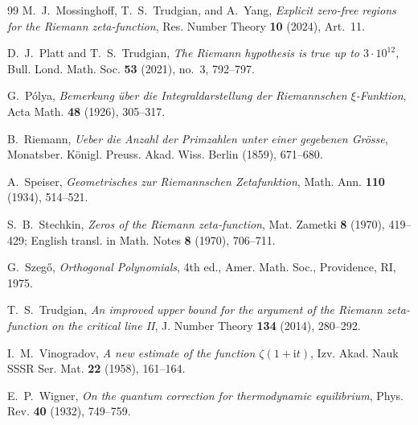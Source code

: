 \documentclass[11pt,reqno]{amsart}
\theoremstyle{definition}
\theoremstyle{remark}
\numberwithin{equation}{section}
\newcommand{\ii}{\mathrm{i}}
\begin{document}
\begin{thebibliography}{99}
M.~J.~Mossinghoff, T.~S.~Trudgian, and A.~Yang,
\emph{Explicit zero-free regions for the Riemann zeta-function},
Res. Number Theory \textbf{10} (2024), Art.~11.

D.~J.~Platt and T.~S.~Trudgian,
\emph{The Riemann hypothesis is true up to $3\cdot 10^{12}$},
Bull. Lond. Math. Soc. \textbf{53} (2021), no.~3, 792--797.

G.~P\'olya,
\emph{Bemerkung \"uber die Integraldarstellung der Riemannschen $\xi$-Funktion},
Acta Math. \textbf{48} (1926), 305--317.

B.~Riemann,
\emph{Ueber die Anzahl der Primzahlen unter einer gegebenen Gr\"osse},
Monatsber. K\"onigl. Preuss. Akad. Wiss. Berlin (1859), 671--680.

A.~Speiser,
\emph{Geometrisches zur Riemannschen Zetafunktion},
Math. Ann. \textbf{110} (1934), 514--521.

S.~B.~Stechkin,
\emph{Zeros of the Riemann zeta-function},
Mat. Zametki \textbf{8} (1970), 419--429; English transl. in Math. Notes \textbf{8} (1970), 706--711.

G.~Szeg\H{o},
\emph{Orthogonal Polynomials},
4th ed., Amer. Math. Soc., Providence, RI, 1975.

T.~S.~Trudgian,
\emph{An improved upper bound for the argument of the Riemann zeta-function on the critical line II},
J. Number Theory \textbf{134} (2014), 280--292.

I.~M.~Vinogradov,
\emph{A new estimate of the function $\zeta(1 + \ii t)$},
Izv. Akad. Nauk SSSR Ser. Mat. \textbf{22} (1958), 161--164.

E.~P.~Wigner,
\emph{On the quantum correction for thermodynamic equilibrium},
Phys. Rev. \textbf{40} (1932), 749--759.

\end{thebibliography}
\end{document}
